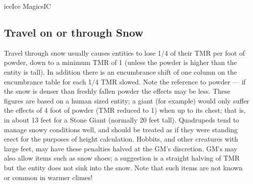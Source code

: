 \begin{College}[1.5]{ice}{Ice Magics}{IC}
\subsection{Travel on or through Snow}

Travel through snow usually causes entities to lose 1/4 of their TMR
per foot of powder, down to a minimum TMR of 1 (unless the powder is
higher than the entity is tall).  In addition there is an encumbrance
shift of one column on the encumbrance table for each 1/4 TMR slowed.
Note the reference to powder --- if the snow is denser than freshly
fallen powder the effects may be less.  These figures are based on a
human sized entity; a giant (for example) would only suffer the
effects of 4 foot of powder (TMR reduced to 1) when up to its chest;
that is, in about 13 feet for a Stone Giant (normally 20 feet tall).
Quadrupeds tend to manage snowy conditions well, and should be treated
as if they were standing erect for the purposes of height calculation.
Hobbits, and other creatures with large feet, may have these penalties
halved at the GM’s discretion.  GM’s may also allow items such as snow
shoes; a suggestion is a straight halving of TMR but the entity does
not sink into the snow.  Note that such items are not known or common
in warmer climes!

\end{College}
